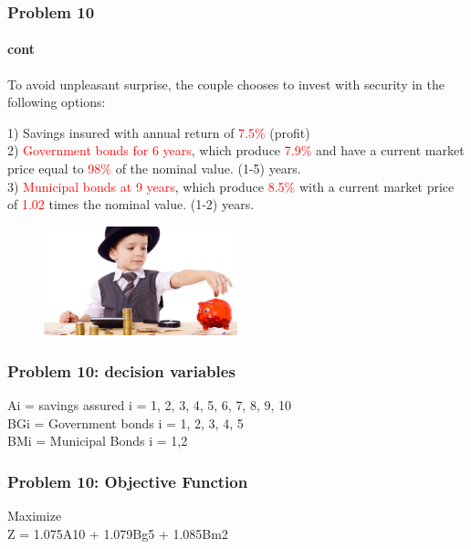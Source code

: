 \documentclass[10pt,svgnames,fragile]{beamer}
\begin{document}
\begin{frame}[label={sec:org9c62e72}]{}
\frametitle{Problem 10}
\framesubtitle{cont}

To avoid unpleasant surprise, the couple chooses to invest with security in the following options:

1) Savings insured with annual return of \textcolor{red}{7.5\%} (profit)\\
2) \textcolor{red}{Government bonds for 6 years}, which produce \textcolor{red}{7.9\%} and have a current market price equal to \textcolor{red}{98\%} of the nominal value. (1-5) years.\\
 3) \textcolor{red}{Municipal bonds at 9 years}, which produce \textcolor{red}{8.5\%} with a current market price of \textcolor{red}{1.02} times the nominal value. (1-2) years.
\begin{figure}
\includegraphics[width=0.5\textwidth]{images/J.jpg}
\end{figure}

\end{frame}


\begin{frame}[label={sec:orge9abdcb}]{}
\frametitle{Problem 10: decision variables }

Ai = savings assured i = 1, 2, 3, 4, 5, 6, 7, 8, 9, 10\\
BGi = Government bonds i = 1, 2, 3, 4, 5\\
BMi = Municipal Bonds i = 1,2

\end{frame}

\begin{frame}[label={sec:orge9abdcb}]{}

\frametitle{Problem 10: Objective Function }
Maximize\\[1em]

Z =  1.075A10 + 1.079Bg5 + 1.085Bm2


\end{frame}
\end{document}
